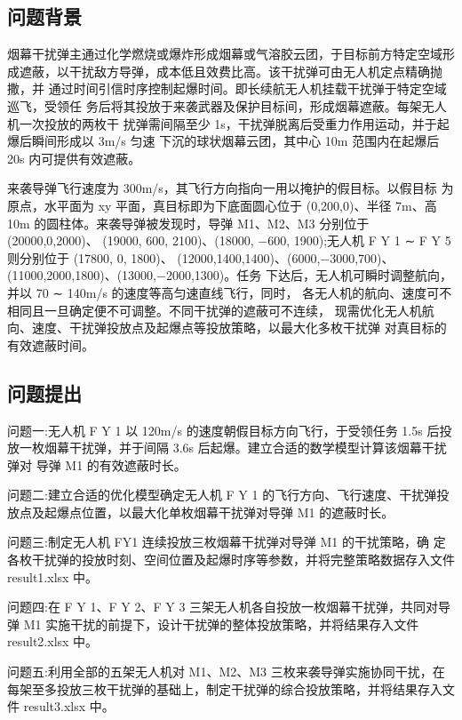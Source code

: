 \documentclass[12pt,a4paper]{ctexart}
\numberwithin{equation}{section}
\begin{document}
	\subsection{问题背景}
烟幕干扰弹主通过化学燃烧或爆炸形成烟幕或气溶胶云团，于目标前方特定空域形 成遮蔽，以干扰敌方导弹，成本低且效费比高。该干扰弹可由无人机定点精确抛撒，并 通过时间引信时序控制起爆时间。即长续航无人机挂载干扰弹于特定空域巡飞，受领任 务后将其投放于来袭武器及保护目标间，形成烟幕遮蔽。每架无人机一次投放的两枚干 扰弹需间隔至少 1s，干扰弹脱离后受重力作用运动，并于起爆后瞬间形成以 3m/s 匀速 下沉的球状烟幕云团，其中心 10m 范围内在起爆后 20s 内可提供有效遮蔽。

来袭导弹飞行速度为 300m/s，其飞行方向指向一用以掩护的假目标。以假目标 为原点，水平面为 xy 平面，真目标即为下底面圆心位于 (0,200,0)、半径 7m、高 10m 的圆柱体。来袭导弹被发现时，导弹 M1、M2、M3 分别位于 (20000,0,2000)、 (19000, 600, 2100)、(18000, −600, 1900);无人机 F Y 1 ∼ F Y 5 则分别位于 (17800, 0, 1800)、 (12000,1400,1400)、(6000,−3000,700)、(11000,2000,1800)、(13000,−2000,1300)。任务 下达后，无人机可瞬时调整航向，并以 70 ∼ 140m/s 的速度等高匀速直线飞行，同时， 各无人机的航向、速度可不相同且一旦确定便不可调整。不同干扰弹的遮蔽可不连续， 现需优化无人机航向、速度、干扰弹投放点及起爆点等投放策略，以最大化多枚干扰弹 对真目标的有效遮蔽时间。

	\subsection{问题提出}
问题一:无人机 F Y 1 以 120m/s 的速度朝假目标方向飞行，于受领任务 1.5s 后投 放一枚烟幕干扰弹，并于间隔 3.6s 后起爆。建立合适的数学模型计算该烟幕干扰弹对 导弹 M1 的有效遮蔽时长。

问题二:建立合适的优化模型确定无人机 F Y 1 的飞行方向、飞行速度、干扰弹投 放点及起爆点位置，以最大化单枚烟幕干扰弹对导弹 M1 的遮蔽时长。

问题三:制定无人机 FY1 连续投放三枚烟幕干扰弹对导弹 M1 的干扰策略，确 定各枚干扰弹的投放时刻、空间位置及起爆时序等参数，并将完整策略数据存入文件 result1.xlsx 中。

问题四:在 F Y 1、F Y 2、F Y 3 三架无人机各自投放一枚烟幕干扰弹，共同对导弹 M1 实施干扰的前提下，设计干扰弹的整体投放策略，并将结果存入文件 result2.xlsx 中。

问题五:利用全部的五架无人机对 M1、M2、M3 三枚来袭导弹实施协同干扰，在 每架至多投放三枚干扰弹的基础上，制定干扰弹的综合投放策略，并将结果存入文件 result3.xlsx 中。
\end{document}

